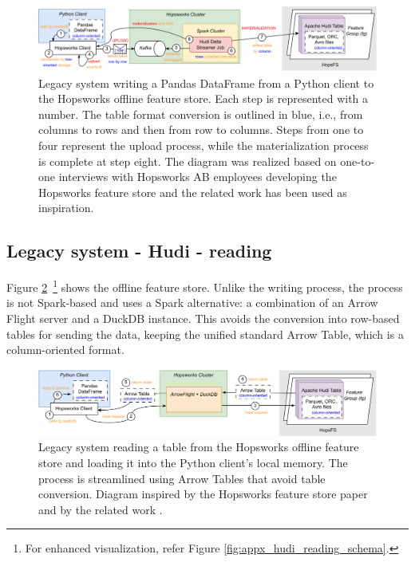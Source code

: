 \begin{figure}
    \begin{center}
      \includegraphics[width=\textwidth]{figures/2-background_and_related_work/hudi_write.png}
    \end{center}
    \caption[Legacy system - Hudi - write process]{Legacy system writing a Pandas DataFrame from a Python client to the Hopsworks offline feature store. Each step is represented with a number. The table format conversion is outlined in blue, i.e., from columns to rows and then from row to columns. Steps from one to four represent the upload process, while the materialization process is complete at step eight. The diagram was realized based on one-to-one interviews with Hopsworks AB employees developing the Hopsworks feature store and the related work \cite{manfrediReducingReadWrite2024} has been used as inspiration.}
    \label{fig:hudi_write}
\end{figure}



\subsection{Legacy system - Hudi - reading}
\label{subsec:back_sys_hudi_read}

Figure \ref{fig:hudi_read}~\footnote{For enhanced visualization, refer Figure \ref{fig:appx_hudi_reading_schema}.}  shows the offline feature store. Unlike the writing process, the process is not Spark-based and uses a Spark alternative: a combination of an Arrow Flight server and a DuckDB instance. This avoids the conversion into row-based tables for sending the data, keeping the unified standard Arrow Table, which is a column-oriented format.

\begin{figure}
    \begin{center}
      \includegraphics[width=\textwidth]{figures/2-background_and_related_work/hudi_read.png}
    \end{center}
    \caption[Legacy system - Hudi - read process]{Legacy system reading a table from the Hopsworks offline feature store and loading it into the Python client's local memory. The process is streamlined using Arrow Tables that avoid table conversion. Diagram inspired by the Hopsworks feature store paper \cite{10.1145/3626246.3653389} and by the related work \cite{manfrediReducingReadWrite2024}.}
    \label{fig:hudi_read}
\end{figure}



